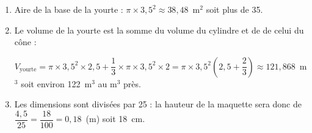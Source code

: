
\medskip

\begin{enumerate}
\item Aire de la base de la yourte : $\pi \times 3,5^2 \approx 38,48$~m$^2$ soit plus de 35.
\item Le volume de la yourte est la somme du volume du cylindre et de de celui du cône :

$V_{\text{yourte}} = \pi \times 3,5^2 \times 2,5 + \dfrac{1}{3} \times \pi \times 3,5^2 \times 2 = \pi \times 3,5^2\left(2,5 + \dfrac{2}{3}\right) \approx 121,868$~m$^3$ soit environ 122~m$^3$ au m$^3$ près.
\item Les dimensions sont divisées par 25 : la hauteur de la maquette sera donc de $\dfrac{4,5}{25} = \dfrac{18}{100} = 0,18$~(m) soit 18~cm.
\end{enumerate}

\bigskip

